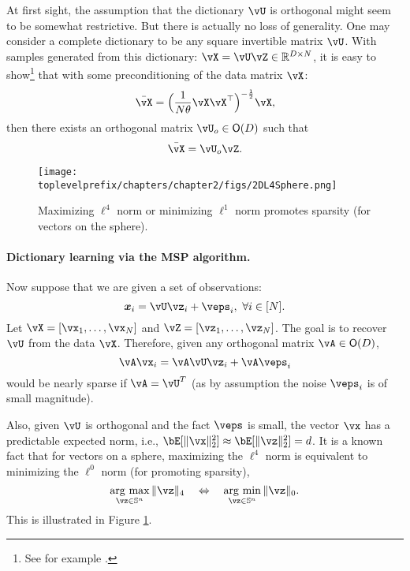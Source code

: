 \documentclass[\toplevelprefix/book-main.tex]{subfiles}
\begin{document}
\begin{remark} 
At first sight, the assumption that the dictionary $\vU$ is orthogonal might seem to be somewhat restrictive. But there is actually no loss of generality. One may consider a complete dictionary to be any square invertible matrix $\vU$. With samples generated from this dictionary: $\vX = \vU \vZ \in \mathbb{R}^{D\times N}$, it is easy to show\footnote{See for example \cite{sun2017completeI}.} that with some preconditioning of the data matrix $\vX$: 
\begin{equation}
    \bar{\vX} = \Big(\frac{1}{N\theta} \vX\vX^\top\Big)^{-\frac{1}{2}}\vX,
\end{equation}
then there exists an orthogonal matrix $\vU_{o} \in \O(D)$ such that
\begin{equation}
    \bar{\vX} = \vU_{o}\vZ.
\end{equation}
\end{remark}



\begin{figure}
    \centering
    \texttt{[image: \\toplevelprefix/chapters/chapter2/figs/2DL4Sphere.png]}\vspace{-0.1in}
    \caption{Maximizing $\ell^4$ norm or minimizing $\ell^1$ norm promotes sparsity (for vectors on the sphere).}
    \label{fig:L4-sphere}
\end{figure}


\paragraph{Dictionary learning via the MSP algorithm.}

Now suppose that we are given a set of observations:
\begin{equation}
    \x_i = \vU \vz_i + \veps_i,\ \forall i \in [N].
\end{equation}
Let $\vX = [\vx_1, \dots, \vx_N]$ and $\vZ = [\vz_1, \dots, \vz_N]$. The goal is to recover $\vU$ from the data $\vX$. Therefore, given any orthogonal matrix $\vA \in \O(D)$, 
\begin{equation}
    \vA\vx_i = \vA\vU \vz_i + \vA\veps_i
\end{equation}
would be nearly sparse if $\vA = \vU^T$ (as by assumption the noise $\veps_i$ is of small magnitude). 

Also, given $\vU$ is orthogonal and the fact $\veps$ is small, the vector $\vx$ has a predictable expected norm, i.e., $\bE[\norm{\vx}_2^2] \approx \bE[\norm{\vz}_2^2]=d$. It is a known fact that for vectors on a sphere, maximizing the $\ell^4$ norm is equivalent to minimizing the $\ell^0$ norm (for promoting sparsity),
\begin{equation}
    \argmax_{\vz \in \mathbb{S}^n}\|\vz\|_{4}\quad\Leftrightarrow\quad \argmin_{\vz \in \mathbb{S}^n}\|\vz\|_{0}.
\end{equation}
This is illustrated in Figure \ref{fig:L4-sphere}.
\end{document}
